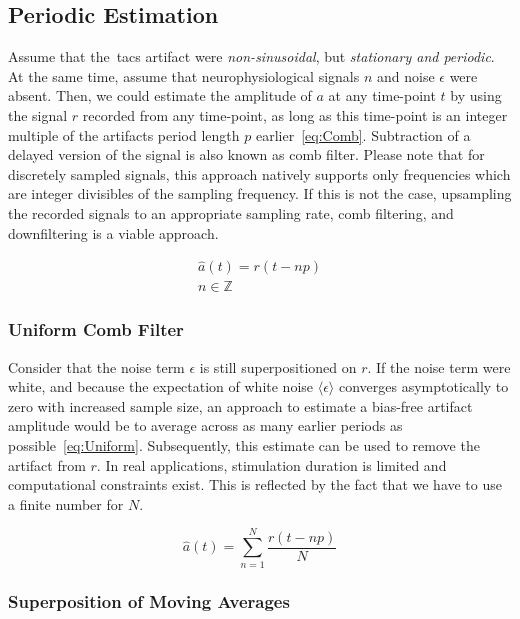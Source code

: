 \documentclass[a4paper]{article}
\begin{document}
\subsection{Periodic Estimation}
Assume that the~\gls{tacs} artifact were \emph{non-sinusoidal}, but \emph{stationary and periodic}. At the same time, assume that neurophysiological signals $n$ and noise $\epsilon$ were absent.
Then, we could estimate the amplitude of $a$ at any time-point $t$ by using the signal $r$ recorded from any time-point, as long as this time-point is an integer multiple of the artifacts period length $p$ earlier~\eqref{eq:Comb}.
Subtraction of a delayed version of the signal is also known as comb filter. Please note that for discretely sampled signals, this approach natively supports only frequencies which are integer divisibles of the sampling frequency. If this is not the case, upsampling the recorded signals to an appropriate sampling rate, comb filtering, and downfiltering is a viable approach.

\begin{eqnarray}
    \hat{a}(t) = r(t-np)\label{eq:Comb}\\
    n \in \mathbb{Z}
\end{eqnarray}

\subsubsection{Uniform Comb Filter}

Consider that the noise term $\epsilon$ is still superpositioned on $r$. If the noise term were white, and because the expectation of white noise $\langle\epsilon\rangle$ converges asymptotically to zero with increased sample size, an approach to estimate a bias-free  artifact amplitude would be to average across as many earlier periods as possible~\eqref{eq:Uniform}.
Subsequently, this estimate can be used to  remove the artifact from $r$.
In real applications, stimulation duration is limited and computational constraints exist. This is reflected by the fact that we have to use a finite number for $N$.

\begin{equation}
    \hat{a}(t) = \sum_{n=1}^{N} \frac{r(t - np)}{N}\label{eq:Uniform}
\end{equation}

\subsubsection{Superposition of Moving Averages}\label{sec:sma}
\end{document}
